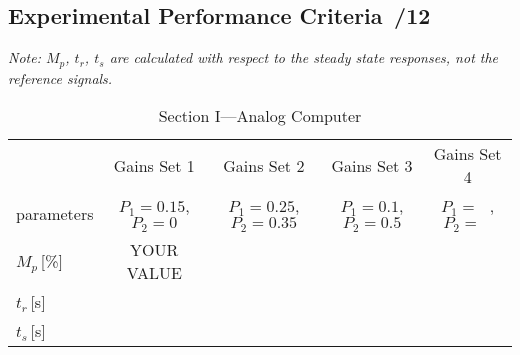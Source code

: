 \documentclass{article}
\newcommand{\score}{\hfill \underline{\hspace{0.65cm}}\,/} %
\begin{document}
\subsection{Experimental Performance Criteria \score 12}
\emph{Note: $M_p$, $t_r$, $t_s$ are calculated with respect to the steady state responses, not the reference signals.}
\begin{table}[phtb]\footnotesize \label{tbl:lab5_q1_2}
\begin{center}
\caption{Section I---Analog Computer}
\begin{tabular}{l|m{1.2cm}|m{1.2cm}|m{1.2cm}|m{1.2cm}|m{1.2cm}|m{1.2cm}|m{1.2cm}|m{1.2cm}} \hline \hline
\cellcolor{lightgray} & \multicolumn{2}{c|}{\cellcolor{lightgray}Gains Set 1} & \multicolumn{2}{c|}{\cellcolor{lightgray}Gains Set 2} & \multicolumn{2}{c|}{\cellcolor{lightgray}Gains Set 3} & \multicolumn{2}{c}{\cellcolor{lightgray}Gains Set 4}\\ \cline{2-9}
\multirow{-2}{*}{\cellcolor{lightgray}parameters}& \multicolumn{2}{c|}{$P_1 = 0.15$, $P_2 = 0$}& \multicolumn{2}{c|}{$P_1 = 0.25$, $P_2 = 0.35$}& \multicolumn{2}{c|}{$P_1 = 0.1$, $P_2 = 0.5$}& \multicolumn{2}{c}{$P_1 = ~~~$, $P_2 = ~~~$}\\ \hline
$M_p$\,[\%]& \multicolumn{2}{c|}{YOUR VALUE} & \multicolumn{2}{c|}{~} & \multicolumn{2}{c|}{~} & \multicolumn{2}{c}{~} \\ \hline
$t_r$\,[\si{\second}] & \multicolumn{2}{c|}{} & \multicolumn{2}{c|}{} & \multicolumn{2}{c|}{} & \multicolumn{2}{c}{} \\ \hline
$t_s$\,[\si{\second}] & \multicolumn{2}{c|}{} & \multicolumn{2}{c|}{} & \multicolumn{2}{c|}{} & \multicolumn{2}{c}{} \\ \hline
\end{tabular}
\end{center}
\end{table}
\end{document}
